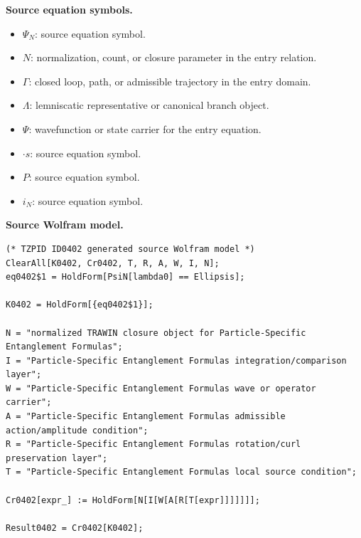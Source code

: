 \begin{minipage}[t]{0.49\linewidth}
\begingroup
\small
\raggedright
\textbf{Source equation symbols.}\par
\begin{itemize}[leftmargin=1.35em,itemsep=1pt,topsep=1pt,parsep=0pt]
    \item $\Psi_{N}$: source equation symbol.
    \item $N$: normalization, count, or closure parameter in the entry relation.
    \item $\Gamma$: closed loop, path, or admissible trajectory in the entry domain.
    \item $\Lambda$: lemniscatic representative or canonical branch object.
    \item $\Psi$: wavefunction or state carrier for the entry equation.
    \item $\cdot s$: source equation symbol.
    \item $P$: source equation symbol.
    \item $i_{N}$: source equation symbol.
\end{itemize}
\endgroup
\end{minipage}\hfill
\begin{minipage}[t]{0.47\linewidth}
\begingroup
\scriptsize
\raggedright
\textbf{Source Wolfram model.}\par
\begin{Verbatim}[fontsize=\tiny,breaklines=true,breakanywhere=true]
(* TZPID ID0402 generated source Wolfram model *)
ClearAll[K0402, Cr0402, T, R, A, W, I, N];
eq0402$1 = HoldForm[PsiN[lambda0] == Ellipsis];

K0402 = HoldForm[{eq0402$1}];

N = "normalized TRAWIN closure object for Particle-Specific Entanglement Formulas";
I = "Particle-Specific Entanglement Formulas integration/comparison layer";
W = "Particle-Specific Entanglement Formulas wave or operator carrier";
A = "Particle-Specific Entanglement Formulas admissible action/amplitude condition";
R = "Particle-Specific Entanglement Formulas rotation/curl preservation layer";
T = "Particle-Specific Entanglement Formulas local source condition";

Cr0402[expr_] := HoldForm[N[I[W[A[R[T[expr]]]]]]];

Result0402 = Cr0402[K0402];
\end{Verbatim}
\endgroup
\end{minipage}

